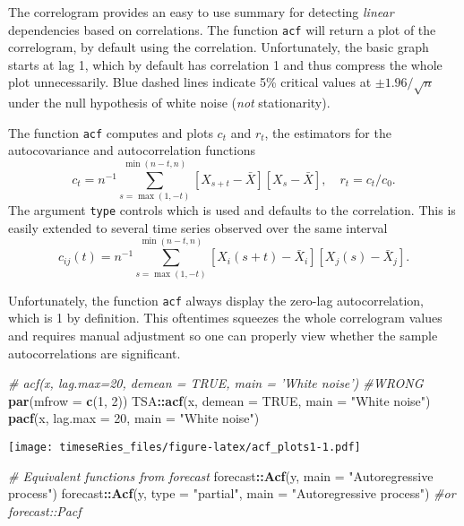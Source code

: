 \documentclass[]{book}
\newenvironment{Shaded}{\begin{snugshade}}{\end{snugshade}}
\newcommand{\CommentTok}[1]{\textcolor[rgb]{0.56,0.35,0.01}{\textit{#1}}}
\newcommand{\DataTypeTok}[1]{\textcolor[rgb]{0.13,0.29,0.53}{#1}}
\newcommand{\DecValTok}[1]{\textcolor[rgb]{0.00,0.00,0.81}{#1}}
\newcommand{\KeywordTok}[1]{\textcolor[rgb]{0.13,0.29,0.53}{\textbf{#1}}}
\newcommand{\NormalTok}[1]{#1}
\newcommand{\OperatorTok}[1]{\textcolor[rgb]{0.81,0.36,0.00}{\textbf{#1}}}
\newcommand{\OtherTok}[1]{\textcolor[rgb]{0.56,0.35,0.01}{#1}}
\newcommand{\StringTok}[1]{\textcolor[rgb]{0.31,0.60,0.02}{#1}}
\begin{document}
The correlogram provides an easy to use summary for detecting
\emph{linear} dependencies based on correlations. The function
\texttt{acf} will return a plot of the correlogram, by default using the
correlation. Unfortunately, the basic graph starts at lag 1, which by
default has correlation 1 and thus compress the whole plot
unnecessarily. Blue dashed lines indicate 5\% critical values at
\(\pm 1.96/\sqrt{n}\) under the null hypothesis of white noise
(\emph{not} stationarity).

The function \texttt{acf} computes and plots \(c_t\) and \(r_t\), the
estimators for the autocovariance and autocorrelation functions
\[c_t= n^{-1}\sum_{s=\max(1,-t)}^{\min(n-t,n)}[X_{s+t}-\bar X][X_s-\bar X], \quad r_t={c_t}/{c_0}.\]
The argument \texttt{type} controls which is used and defaults to the
correlation. This is easily extended to several time series observed
over the same interval
\[c_{ij}(t) = n^{-1}\sum_{s=\max(1,-t)}^{\min(n-t,n)}[X_i(s+t)-\bar X_i][X_j(s)-\bar X_j].\]

Unfortunately, the function \texttt{acf} always display the zero-lag
autocorrelation, which is 1 by definition. This oftentimes squeezes the
whole correlogram values and requires manual adjustment so one can
properly view whether the sample autocorrelations are significant.

\begin{Shaded}
\begin{Highlighting}[]
\CommentTok{# acf(x, lag.max=20, demean = TRUE, main = 'White noise') #WRONG}
\KeywordTok{par}\NormalTok{(}\DataTypeTok{mfrow =} \KeywordTok{c}\NormalTok{(}\DecValTok{1}\NormalTok{, }\DecValTok{2}\NormalTok{))}
\NormalTok{TSA}\OperatorTok{::}\KeywordTok{acf}\NormalTok{(x, }\DataTypeTok{demean =} \OtherTok{TRUE}\NormalTok{, }\DataTypeTok{main =} \StringTok{"White noise"}\NormalTok{)}
\KeywordTok{pacf}\NormalTok{(x, }\DataTypeTok{lag.max =} \DecValTok{20}\NormalTok{, }\DataTypeTok{main =} \StringTok{"White noise"}\NormalTok{)}
\end{Highlighting}
\end{Shaded}

\texttt{[image: timeseRies\_files/figure-latex/acf\_plots1-1.pdf]}

\begin{Shaded}
\begin{Highlighting}[]
\CommentTok{# Equivalent functions from forecast}
\NormalTok{forecast}\OperatorTok{::}\KeywordTok{Acf}\NormalTok{(y, }\DataTypeTok{main =} \StringTok{"Autoregressive process"}\NormalTok{)}
\NormalTok{forecast}\OperatorTok{::}\KeywordTok{Acf}\NormalTok{(y, }\DataTypeTok{type =} \StringTok{"partial"}\NormalTok{, }\DataTypeTok{main =} \StringTok{"Autoregressive process"}\NormalTok{)  }\CommentTok{#or forecast::Pacf}
\end{Highlighting}
\end{Shaded}
\end{document}
